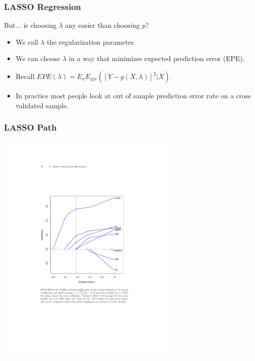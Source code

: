 \documentclass[xcolor=pdftex,dvipsnames,table,mathserif]{beamer}
\begin{document}
\begin{frame}
\frametitle{LASSO Regression}
But... is choosing $\lambda$ any easier than choosing $p$?
\begin{itemize}
\item We call $\lambda$ the \alert{regularization} parameter.
\item We can choose $\lambda$ in a way that minimizes expected prediction error (EPE).
\item Recall $EPE(\lambda) = E_x E_{y|x} ([ Y- g(X,\lambda)]^2 | X)$.
\item In practice most people look at out of sample prediction error rate on a \alert{cross validated sample}.
\end{itemize}
\end{frame}

\begin{frame}
\frametitle{LASSO Path}
\begin{center}
\includegraphics[width=3.5in]{./resources/lassopath}
\end{center}
\end{frame}
\end{document}
